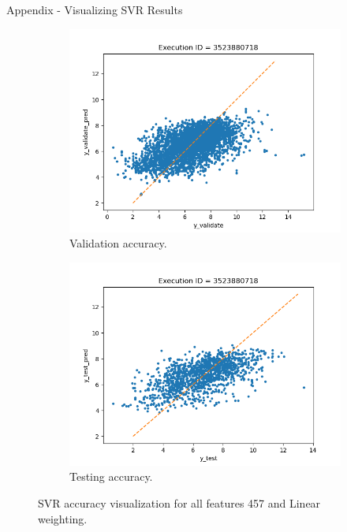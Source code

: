 \documentclass{beamer}
\begin{document}
\begin{frame}[t]{Appendix - Visualizing SVR Results}
\begin{figure}
     \centering
     \begin{subfigure}[b]{0.45\textwidth}
         \centering
         \includegraphics[scale=0.35]{images/SVRvalidate}
         \caption{Validation accuracy.}
        \label{fig:SVRvalidate}
     \end{subfigure}
     \hfill
     \begin{subfigure}[b]{0.45\textwidth}
         \centering
         \includegraphics[scale=0.35]{images/SVRtest}
        \caption{Testing accuracy.}
        \label{fig:SVRtest}
     \end{subfigure}
     \caption{SVR accuracy visualization for all features 457 and Linear weighting.}
     \label{fig:SVRaccuracy}
\end{figure}
\end{frame}
\end{document}
